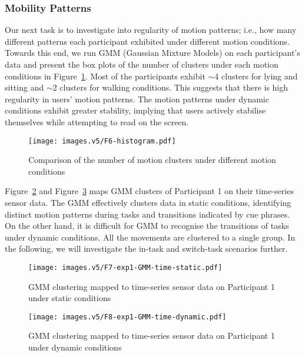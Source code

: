 \subsubsection{Mobility Patterns}
Our next task is to investigate into regularity of motion patterns; i.e., how many different patterns each participant exhibited under different motion conditions. Towards this end, we run GMM (Gaussian Mixture Models) on each participant's data and present the box plots of the number of clusters under each motion conditions in Figure~\ref{fig:gmmhistogram}. Most of the participants exhibit $\sim$4 clusters for lying and sitting and $\sim$2 clusters for walking conditions. This suggests that there is high regularity in users' motion patterns. The motion patterns under dynamic conditions exhibit greater stability, implying that users actively stabilise themselves while attempting to read on the screen. 

\begin{figure}[!htbp]
     \centering
         \centering
         \texttt{[image: images.v5/F6-histogram.pdf]}
    \caption{Comparison of the number of motion clusters under different motion conditions}
    \label{fig:gmmhistogram}
\end{figure}

Figure~\ref{fig:exp1gmmtimep1static} and Figure~\ref{fig:exp1gmmtimep1dynamic} maps GMM clusters of Participant 1 on their time-series sensor data. The GMM effectively clusters data in static conditions, identifying distinct motion patterns during tasks and transitions indicated by cue phrases. On the other hand, it is difficult for GMM to recognise the transitions of tasks under dynamic conditions. All the movements are clustered to a single group. In the following, we will investigate the in-task and switch-task scenarios further. 

\begin{figure}[!htbp]
    \centering
    \texttt{[image: images.v5/F7-exp1-GMM-time-static.pdf]}
    \caption{GMM clustering mapped to time-series sensor data on Participant 1 under static conditions}
    \label{fig:exp1gmmtimep1static}
\end{figure}

\begin{figure}[!htbp]
    \centering
    \texttt{[image: images.v5/F8-exp1-GMM-time-dynamic.pdf]}
    \caption{GMM clustering mapped to time-series sensor data on Participant 1 under dynamic conditions}
    \label{fig:exp1gmmtimep1dynamic}
\end{figure}


